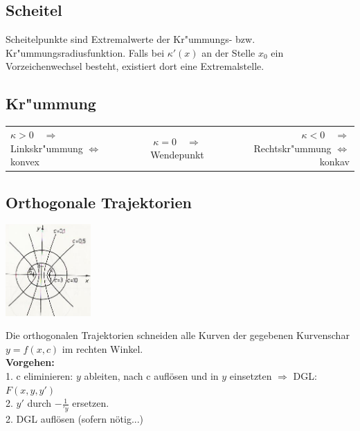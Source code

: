 \subsection{Scheitel }
Scheitelpunkte sind Extremalwerte der Kr"ummungs- bzw. Kr"ummungsradiusfunktion.
Falls bei $\kappa'(x)$ an der Stelle $x_0$ ein Vorzeichenwechsel besteht, existiert dort
eine Extremalstelle. 

\subsection{Kr"ummung }
\begin{tabular}{l|c|r}
  $\kappa > 0 \quad\Rightarrow$ \quad Linkskr"ummung $\iff$ konvex &
  $\kappa = 0 \quad\Rightarrow$ \quad Wendepunkt \quad & \quad
  $\kappa < 0 \quad\Rightarrow$ \quad Rechtskr"ummung $\iff$ konkav
  \\ 
\end{tabular}


\subsection{Orthogonale Trajektorien }
	\begin{minipage}{.2\textwidth}
		\includegraphics[height=3.5cm]{bilder/orthoTrajekt_klein.png}
	\end{minipage}%
	\begin{minipage}{.8\textwidth}
		Die orthogonalen Trajektorien schneiden alle Kurven der gegebenen Kurvenschar
		$y=f(x,c)$ im rechten Winkel.\\
		\textbf{Vorgehen:} \\
		1. c eliminieren: $y$ ableiten, nach c auflösen und in $y$ einsetzten
		$\Rightarrow$ DGL: $F(x,y,y')$ \\
		2. $y'$ durch $-\frac{1}{'y}$ ersetzen. \\
		2. DGL auflösen (sofern nötig...)\\
	\end{minipage}

